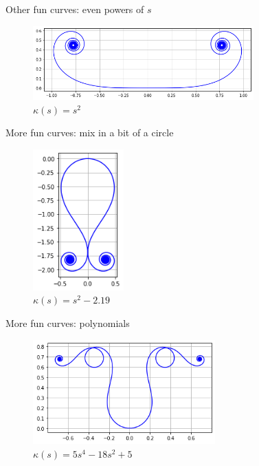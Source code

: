 \documentclass{beamer}
\begin{document}
\begin{frame}{Other fun curves: even powers of $s$}
	\begin{figure}
		\caption{$\kappa(s) = s^2$}
		\centering
		\includegraphics[width=85mm, scale=0.5]{chaise_longue.png}
	\end{figure}
\end{frame}

\begin{frame}{More fun curves: mix in a bit of a circle}
	\begin{figure}
		\caption{$\kappa(s) = s ^ 2 -2.19$}
		\centering
		\includegraphics[width=35mm, scale=0.2]{s_squared_minus_219.png}
	\end{figure}
\end{frame}

\begin{frame}{More fun curves: polynomials}
	\begin{figure}
		\caption{$\kappa(s) = 5 s ^ 4 - 18 s ^ 2 + 5$}
		\centering
		\includegraphics[width=70mm, scale=0.5]{five_s^4.png}
	\end{figure}
\end{frame}
\end{document}
